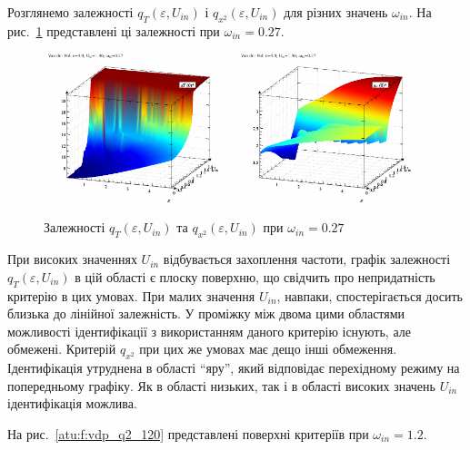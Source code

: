 Розглянемо залежності
$ q_T (\varepsilon, U_{in}) $ і
$ q_{x ^ 2} (\varepsilon, U_{in}) $ для різних значень
$ \omega_{in} $.
На рис.~\ref{atu:f:vdp_q2_027} представлені ці залежності при
$ \omega_{in} = 0.27 $.


\begin{figure}[ht!]
\begin{center}
  \includegraphics[width=0.49\textwidth]{p/cha/vdp/vdp_q_2d-p_qT_ome_0x27.png}
  \hfill
  \includegraphics[width=0.49\textwidth]{p/cha/vdp/vdp_q_2d-p_qx2_ome_0x27.png}
\end{center}
  \caption{Залежності $q_T(\varepsilon,U_{in})$ та $q_{x^2}(\varepsilon,U_{in})$  при $\omega_{in}=0.27$}
\label{atu:f:vdp_q2_027}
\end{figure}

При високих значеннях
$ U_{in} $ відбувається захоплення частоти, графік залежності
$ q_T (\varepsilon, U_{in}) $ в цій області є плоску поверхню, що свідчить
про непридатність критерію в цих умовах. При малих значення
$ U_{in} $, навпаки, спостерігається досить близька до лінійної
залежність. У проміжку між двома цими областями можливості
ідентифікації з використанням даного критерію існують, але
обмежені. Критерій
$q_{x^2} $ при цих же умовах має дещо інші обмеження. Ідентифікація
утруднена в області ``яру'', який відповідає перехідному режиму
на попередньому графіку. Як в області низьких, так і в області
високих значень
$ U_{in} $ ідентифікація можлива.

На рис.~\ref{atu:f:vdp_q2_120} представлені поверхні критеріїв при
$ \omega_{in} = 1.2 $.

